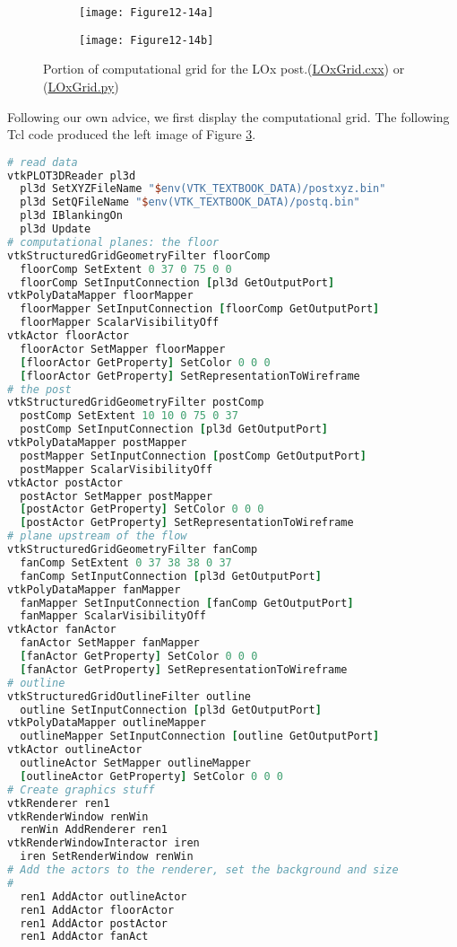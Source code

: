 \begin{figure}[htb]
	\begin{subfigure}[h]{0.48\linewidth}
		\texttt{[image: Figure12-14a]}
		\caption*{}
		\label{fig:Figure12-14a}
	\end{subfigure}
	\hfill
	\begin{subfigure}[h]{0.48\linewidth}
		\texttt{[image: Figure12-14b]}
		\caption*{}
		\label{fig:Figure12-14b}
	\end{subfigure}
	\caption{Portion of computational grid for the LOx post.(\href{https://lorensen.github.io/VTKExamples/site/Cxx/VisualizationAlgorithms/LOxGrid/}{LOxGrid.cxx}) or (\href{https://lorensen.github.io/VTKExamples/site/Python/VisualizationAlgorithms/LOxGrid/}{LOxGrid.py})}\label{fig:Figure12-14}
\end{figure}

Following our own advice, we first display the computational grid. The
following Tcl code produced the left image of Figure \ref{fig:Figure12-14}.

\begin{lstlisting}[language=TCL, caption={Display the computational grid.}]
# read data
vtkPLOT3DReader pl3d
  pl3d SetXYZFileName "$env(VTK_TEXTBOOK_DATA)/postxyz.bin"
  pl3d SetQFileName "$env(VTK_TEXTBOOK_DATA)/postq.bin"
  pl3d IBlankingOn
  pl3d Update
# computational planes: the floor
vtkStructuredGridGeometryFilter floorComp
  floorComp SetExtent 0 37 0 75 0 0
  floorComp SetInputConnection [pl3d GetOutputPort]
vtkPolyDataMapper floorMapper
  floorMapper SetInputConnection [floorComp GetOutputPort]
  floorMapper ScalarVisibilityOff
vtkActor floorActor
  floorActor SetMapper floorMapper
  [floorActor GetProperty] SetColor 0 0 0
  [floorActor GetProperty] SetRepresentationToWireframe
# the post
vtkStructuredGridGeometryFilter postComp
  postComp SetExtent 10 10 0 75 0 37
  postComp SetInputConnection [pl3d GetOutputPort]
vtkPolyDataMapper postMapper
  postMapper SetInputConnection [postComp GetOutputPort]
  postMapper ScalarVisibilityOff
vtkActor postActor
  postActor SetMapper postMapper
  [postActor GetProperty] SetColor 0 0 0
  [postActor GetProperty] SetRepresentationToWireframe
# plane upstream of the flow
vtkStructuredGridGeometryFilter fanComp
  fanComp SetExtent 0 37 38 38 0 37
  fanComp SetInputConnection [pl3d GetOutputPort]
vtkPolyDataMapper fanMapper
  fanMapper SetInputConnection [fanComp GetOutputPort]
  fanMapper ScalarVisibilityOff
vtkActor fanActor
  fanActor SetMapper fanMapper
  [fanActor GetProperty] SetColor 0 0 0
  [fanActor GetProperty] SetRepresentationToWireframe
# outline
vtkStructuredGridOutlineFilter outline
  outline SetInputConnection [pl3d GetOutputPort]
vtkPolyDataMapper outlineMapper
  outlineMapper SetInputConnection [outline GetOutputPort]
vtkActor outlineActor
  outlineActor SetMapper outlineMapper
  [outlineActor GetProperty] SetColor 0 0 0
# Create graphics stuff
vtkRenderer ren1
vtkRenderWindow renWin
  renWin AddRenderer ren1
vtkRenderWindowInteractor iren
  iren SetRenderWindow renWin
# Add the actors to the renderer, set the background and size
#
  ren1 AddActor outlineActor
  ren1 AddActor floorActor
  ren1 AddActor postActor
  ren1 AddActor fanAct
\end{lstlisting}

